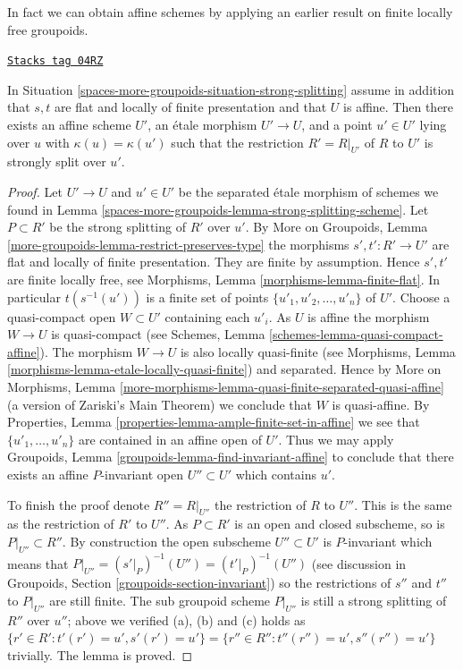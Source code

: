 In fact we can obtain affine schemes by applying an earlier result
on finite locally free groupoids.

\begin{lemma}
\label{spaces-more-groupoids-lemma-strong-splitting-affine-scheme}
\href{https://stacks.math.columbia.edu/tag/04RZ}{\texttt{Stacks tag 04RZ}}

In Situation \ref{spaces-more-groupoids-situation-strong-splitting} assume in addition that
$s, t$ are flat and locally of finite presentation and that $U$ is affine.
Then there exists an affine scheme $U'$, an \'etale morphism
$U' \to U$, and a point $u' \in U'$ lying over $u$ with
$\kappa(u) = \kappa(u')$ such that the restriction $R' = R|_{U'}$ of
$R$ to $U'$ is strongly split over $u'$.
\end{lemma}

\begin{proof}
Let $U' \to U$ and $u' \in U'$ be the separated \'etale morphism of schemes
we found in Lemma \ref{spaces-more-groupoids-lemma-strong-splitting-scheme}.
Let $P \subset R'$ be the strong splitting of $R'$ over $u'$. By
More on Groupoids, Lemma \ref{more-groupoids-lemma-restrict-preserves-type}
the morphisms $s', t' : R' \to U'$ are flat and locally of finite presentation.
They are finite by assumption. Hence $s', t'$ are finite locally
free, see
Morphisms, Lemma \ref{morphisms-lemma-finite-flat}.
In particular $t(s^{-1}(u'))$ is a finite set of points
$\{u'_1, u'_2, \ldots, u'_n\}$ of $U'$. Choose a quasi-compact open
$W \subset U'$ containing each $u'_i$. As $U$ is affine the morphism
$W \to U$ is quasi-compact (see
Schemes, Lemma \ref{schemes-lemma-quasi-compact-affine}).
The morphism $W \to U$ is also locally quasi-finite (see
Morphisms, Lemma \ref{morphisms-lemma-etale-locally-quasi-finite})
and separated. Hence by
More on Morphisms,
Lemma \ref{more-morphisms-lemma-quasi-finite-separated-quasi-affine}
(a version of Zariski's Main Theorem)
we conclude that $W$ is quasi-affine. By
Properties, Lemma \ref{properties-lemma-ample-finite-set-in-affine}
we see that $\{u'_1, \ldots, u'_n\}$ are contained in an affine
open of $U'$. Thus we may apply
Groupoids, Lemma \ref{groupoids-lemma-find-invariant-affine}
to conclude that there exists an affine $P$-invariant open
$U'' \subset U'$ which contains $u'$.

\medskip\noindent
To finish the proof denote $R'' = R|_{U''}$ the restriction of $R$
to $U''$. This is the same as the restriction of $R'$ to $U''$.
As $P \subset R'$ is an open and closed subscheme, so is
$P|_{U''} \subset R''$. By construction the open subscheme $U'' \subset U'$
is $P$-invariant which means that
$P|_{U''} = (s'|_P)^{-1}(U'') = (t'|_P)^{-1}(U'')$
(see discussion in
Groupoids, Section \ref{groupoids-section-invariant})
so the restrictions of $s''$ and $t''$ to $P|_{U''}$ are still finite.
The sub groupoid scheme $P|_{U''}$ is still a strong splitting of
$R''$ over $u''$; above we verified (a), (b) and (c) holds as
$\{r' \in R': t'(r') = u', s'(r') = u'\} =
\{r'' \in R'': t''(r'') = u', s''(r'') = u'\}$ trivially.
The lemma is proved.
\end{proof}


